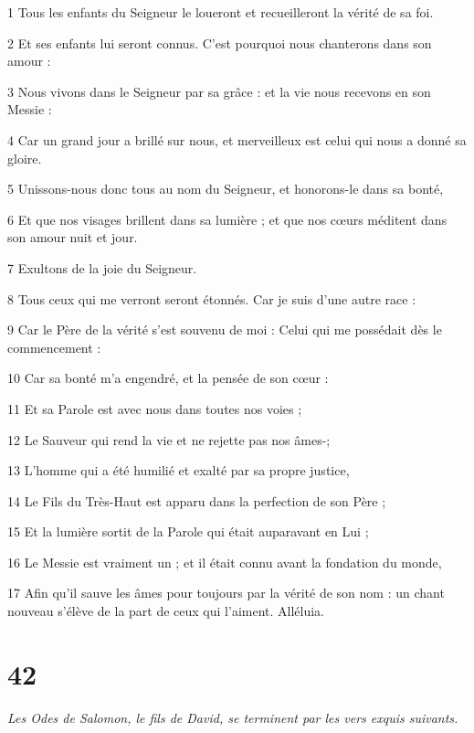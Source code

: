 \par 1 Tous les enfants du Seigneur le loueront et recueilleront la vérité de sa foi.
\par 2 Et ses enfants lui seront connus. C'est pourquoi nous chanterons dans son amour :
\par 3 Nous vivons dans le Seigneur par sa grâce : et la vie nous recevons en son Messie :
\par 4 Car un grand jour a brillé sur nous, et merveilleux est celui qui nous a donné sa gloire.
\par 5 Unissons-nous donc tous au nom du Seigneur, et honorons-le dans sa bonté,
\par 6 Et que nos visages brillent dans sa lumière ; et que nos cœurs méditent dans son amour nuit et jour.
\par 7 Exultons de la joie du Seigneur.
\par 8 Tous ceux qui me verront seront étonnés. Car je suis d'une autre race :
\par 9 Car le Père de la vérité s'est souvenu de moi : Celui qui me possédait dès le commencement :
\par 10 Car sa bonté m'a engendré, et la pensée de son cœur :
\par 11 Et sa Parole est avec nous dans toutes nos voies ;
\par 12 Le Sauveur qui rend la vie et ne rejette pas nos âmes-;
\par 13 L'homme qui a été humilié et exalté par sa propre justice,
\par 14 Le Fils du Très-Haut est apparu dans la perfection de son Père ;
\par 15 Et la lumière sortit de la Parole qui était auparavant en Lui ;
\par 16 Le Messie est vraiment un ; et il était connu avant la fondation du monde,
\par 17 Afin qu'il sauve les âmes pour toujours par la vérité de son nom : un chant nouveau s'élève de la part de ceux qui l'aiment. Alléluia.

\chapter{42}

\par \textit{Les Odes de Salomon, le fils de David, se terminent par les vers exquis suivants.}

